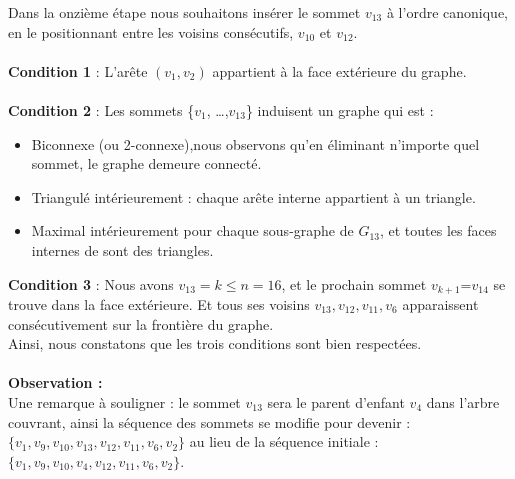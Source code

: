 \documentclass[hidelinks,letterpaper,12pt]{article}
\begin{document}
Dans la onzième étape nous souhaitons insérer le sommet $v_{13}$ à l'ordre canonique, en le positionnant entre les voisins consécutifs, $v_{10}$ et $v_{12}$.
\\ \\
\textbf{Condition 1} : L'arête \( (v_1,v_2) \) appartient à la face extérieure du graphe.
\\ \\
\textbf{Condition 2} : Les sommets \{$v_1$, \ldots ,$v_{13}$\} induisent un graphe qui est :
\begin{itemize}
\item Biconnexe (ou 2-connexe),nous observons qu'en éliminant n'importe quel sommet, le graphe demeure connecté.
\item Triangulé intérieurement : chaque arête interne appartient à un triangle.
\item Maximal intérieurement pour chaque sous-graphe de $G_{13}$, et toutes les faces internes de sont des triangles.
\\
\end{itemize}
\textbf{Condition 3} : Nous avons $v_{13}=k \leq n=16$, et le prochain sommet $v_{k+1}$=$v_{14}$ se trouve dans la face extérieure. Et tous ses voisins \(v_{13}, v_{12}, v_{11}, v_{6}\) apparaissent consécutivement sur la frontière du graphe.
\\
Ainsi, nous constatons que les trois conditions sont bien respectées.
\\ \\
\textbf{Observation :}
\\
Une remarque à souligner : le sommet \(v_{13}\) sera le parent d'enfant \(v_4\) dans l'arbre couvrant, ainsi la séquence des sommets se modifie pour devenir : \(\{v_1, v_9, v_{10}, v_{13}, v_{12}, v_{11}, v_6, v_2\}\) au lieu de la séquence initiale : \(\{v_1, v_9, v_{10}, v_4, v_{12}, v_{11}, v_6, v_2\}\).
\end{document}
